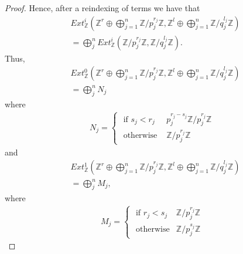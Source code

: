 \documentclass[12pt]{extarticle}
\newcommand{\Z}{\mathbb{Z}}
\newcommand{\<}{\langle}
\renewcommand{\>}{\rangle}
\theoremstyle{definition}
\begin{document}
\begin{proof}
  Hence, after a reindexing of terms we have that
  \begin{align*}
    &Ext_{\Z}^i(\Z^r \oplus \bigoplus\limits_{j=1}^n \Z/p_j^{r_j}\Z, \Z^l
    \oplus \bigoplus\limits_{j=1}^n \Z/q_j^{l_j}\Z) \\
    &= \bigoplus\limits_{j}^{n} Ext_{\Z}^i( \Z/p_j^{r_j}\Z, \Z/q_j^{l_j}\Z).
  \end{align*}
  Thus,
  \begin{align*}
    &Ext_{\Z}^0(\Z^r \oplus \bigoplus\limits_{j=1}^n \Z/p_j^{r_j}\Z, \Z^l
    \oplus \bigoplus\limits_{j=1}^n \Z/q_j^{l_j}\Z) \\
    &= \bigoplus\limits_{j}^{n}  N_j
  \end{align*}
  where
  \begin{align*}
    N_j =
    \begin{cases}
      \text{ if } s_j<r_j & p_j^{r_j-s_j}\Z/p_j^{r_j} \Z \\
      \text{ otherwise } & \Z/p_j^{r_j} \Z
    \end{cases}
  \end{align*}
  and
  \begin{align*}
    &Ext_{\Z}^1(\Z^r \oplus \bigoplus\limits_{j=1}^n \Z/p_j^{r_j}\Z, \Z^l
    \oplus \bigoplus\limits_{j=1}^n \Z/q_j^{l_j}\Z) \\
    &= \bigoplus\limits_{j}^{n} M_j,
  \end{align*}
  where
  \begin{align*}
    M_j =
    \begin{cases}
      \text { if } r_j < s_j & \Z/p_j^{r_j} \Z \\
      \text { otherwise} & \Z/p_j^{s_j} \Z 
    \end{cases}
  \end{align*}
  

\end{proof}
\end{document}
